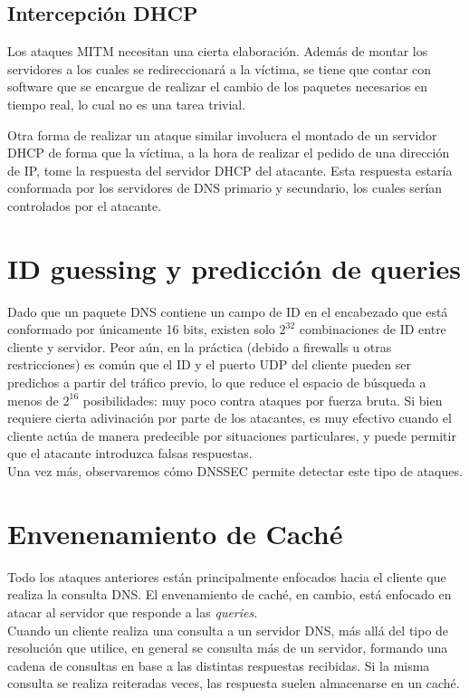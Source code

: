 \subsection{Intercepci\'on DHCP}

Los ataques MITM necesitan una cierta elaboraci\'on. Adem\'as de montar los
servidores a los cuales se redireccionar\'a a la v\'ictima, se tiene que contar
con software que se encargue de realizar el cambio de los paquetes necesarios en
tiempo real, lo cual no es una tarea trivial. 

Otra forma de realizar un ataque similar involucra el montado de un servidor
DHCP de forma que la v\'ictima, a la hora de realizar el pedido de una
direcci\'on de IP, tome la respuesta del servidor DHCP del atacante. Esta
respuesta estar\'ia conformada por los servidores de DNS primario y secundario,
los cuales ser\'ian controlados por el atacante.

\section{ID guessing y predicci\'on de queries}

Dado que un paquete DNS contiene un campo de ID en el encabezado que est\'a conformado por \'unicamente 16 bits, existen solo $2^{32}$ combinaciones de ID entre cliente y servidor. Peor a\'un, en la pr\'actica (debido a firewalls u otras restricciones) es com\'un que el ID y el puerto UDP del cliente pueden ser predichos a partir del tr\'afico previo, lo que reduce el espacio de b\'usqueda a menos de $2^{16}$ posibilidades: muy poco contra ataques por fuerza bruta. Si bien requiere cierta adivinaci\'on por parte de los atacantes, es muy efectivo cuando el cliente act\'ua de manera predecible por situaciones particulares, y puede permitir que el atacante introduzca falsas respuestas.\\
Una vez m\'as, observaremos c\'omo DNSSEC permite detectar este tipo de ataques.

\section{Envenenamiento de Cach\'e}

Todo los ataques anteriores están principalmente enfocados hacia el cliente que realiza la consulta DNS. El envenamiento de cach\'e, en cambio, está enfocado en atacar al servidor que responde a las \textit{queries}.\\
Cuando un cliente realiza una consulta a un servidor DNS, m\'as all\'a del tipo de resoluci\'on que utilice, en general se consulta m\'as de un servidor, formando una cadena de consultas en base a las distintas respuestas recibidas. Si la misma consulta se realiza reiteradas veces, las respuesta suelen almacenarse en un cach\'e.\\

